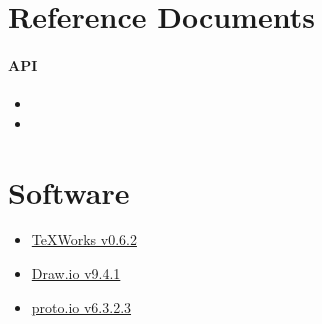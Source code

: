 \section{Reference Documents}

\paragraph{API}
\begin{itemize}
\item {}
\item {}
\end{itemize}

\section{Software}
\begin{itemize}
\item \href{http://www.tug.org/texworks/}{TeXWorks v0.6.2}
\item \href{https://about.draw.io/}{Draw.io v9.4.1}
\item \href{https://proto.io/}{proto.io v6.3.2.3}
\end{itemize}